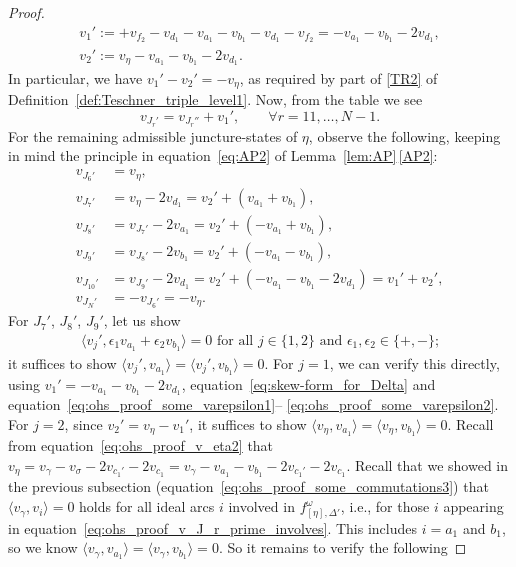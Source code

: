 \documentclass[10pt,a4paper]{amsart}
\numberwithin{equation}{section}
\theoremstyle{definition}
\begin{document}
\begin{proof}
\begin{gather*}
v_1' := +v_{f_2} - v_{d_1} - v_{a_1} - v_{b_1} - v_{d_1} - v_{f_2} = - v_{a_1} - v_{b_1} - 2 v_{d_1}, \\
v_2' := v_\eta - v_{a_1} - v_{b_1} - 2 v_{d_1}.
\end{gather*}
In particular, we have $v_1' - v_2' = - v_\eta$, as required by part of \ref{TR2} of Definition~\ref{def:Teschner_triple_level1}. Now, from the table we see
\[
v_{J_r'} = v_{J_r''} + v_1', \qquad \forall r = 11, \dots, N-1.
\]
For the remaining admissible juncture-states of $\eta$, observe the following, keeping in mind the principle in equation~\eqref{eq:AP2} of Lemma~\ref{lem:AP}\,\ref{AP2}:
\begin{align*}
v_{J_6'} & = v_\eta, \\
v_{J_7'} & = v_\eta - 2 v_{d_1} = v_2' + (v_{a_1} + v_{b_1}), \\
v_{J_8'} & = v_{J_7'} - 2 v_{a_1} = v_2' + (-v_{a_1} + v_{b_1}), \\
v_{J_9'} & = v_{J_8'} - 2 v_{b_1} = v_2' + (-v_{a_1} - v_{b_1}), \\
v_{J_{10}'} & = v_{J_9'} - 2 v_{d_1} = v_2' + (-v_{a_1} - v_{b_1} - 2v_{d_1}) = v_1' + v_2', \\
v_{J_N'} & = - v_{J_6'} = - v_\eta.
\end{align*}
For $J_7'$, $J_8'$, $J_9'$, let us show
\begin{align}
\label{eq:ohs_proof2_eqn1}
\mbox{$\langle v_j', \epsilon_1 v_{a_1} + \epsilon_2 v_{b_1} \rangle=0$ for all $j\in\{1,2\}$ and $\epsilon_1,\epsilon_2 \in \{+,-\}$;}
\end{align}
it suffices to show $\langle v_j', v_{a_1}\rangle=\langle v_j',v_{b_1}\rangle=0$. For $j=1$, we can verify this directly, using $v_1' = - v_{a_1} - v_{b_1} - 2v_{d_1}$, equation~\eqref{eq:skew-form_for_Delta} and equation~\eqref{eq:ohs_proof_some_varepsilon1}-- \eqref{eq:ohs_proof_some_varepsilon2}.
For $j=2$, since $v_2' = v_\eta - v_1'$, it suffices to show $\langle v_\eta,v_{a_1}\rangle = \langle v_\eta, v_{b_1}\rangle=0$. Recall from equation~\eqref{eq:ohs_proof_v_eta2} that $v_\eta = {v_\gamma} - {v_\sigma} - 2 {v_{c_1'}} - 2 {v_{c_1}} = v_\gamma - v_{a_1} - v_{b_1} - 2v_{c_1'} - 2v_{c_1}$. Recall that we showed in the previous subsection (equation~\eqref{eq:ohs_proof_some_commutations3}) that $\langle v_\gamma,v_i\rangle=0$ holds for all ideal arcs $i$ involved in $f^\omega_{[\eta],\Delta'}$, i.e., for those $i$ appearing in equation~\eqref{eq:ohs_proof_v_J_r_prime_involves}. This includes $i=a_1$ and $b_1$, so we know $\langle v_\gamma,v_{a_1}\rangle=\langle v_\gamma,v_{b_1}\rangle=0$. So it remains to verify the following

\end{proof}
\end{document}
